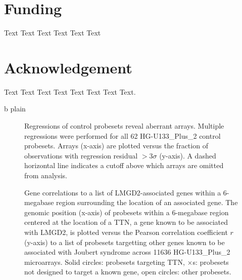 \documentclass{bioinfo}
\begin{document}
\section*{Funding}
Text Text Text Text Text Text

\section*{Acknowledgement}
Text Text Text Text Text Text  Text Text.

 {b}
 {plain}
\newpage



\begin{figure}[!tpb]
\label{figure:rsquare}
\centerline{}
\caption{Regressions of control probesets reveal aberrant arrays.  Multiple
regressions were performed for all 62 HG-U133\_Plus\_2 control probesets.
Arrays (x-axis) are plotted versus the fraction of observations with regression
residual $>3\sigma$ (y-axis).  A dashed horizontal line indicates a cutoff
above which arrays are omitted from analysis.}
\end{figure}


\begin{figure}[!tpb]
\label{figure:TTN}
\centerline{}
\caption{Gene correlations to a list of LMGD2-associated genes within a
6-megabase region surrounding the location of an associated gene.  The genomic
position (x-axis) of probesets within a 6-megabase region centered at the
location of a TTN, a gene known to be associated with LMGD2, is plotted versus
the Pearson correlation coefficient $r$ (y-axis) to a list of probesets
targetting other genes known to be associated with Joubert syndrome across
11636 HG-U133\_Plus\_2 microarrays.  Solid circles: probesets targeting TTN,
$\times$s: probesets not designed to target a known gene, open circles: other
probesets.}
\end{figure}
\end{document}
